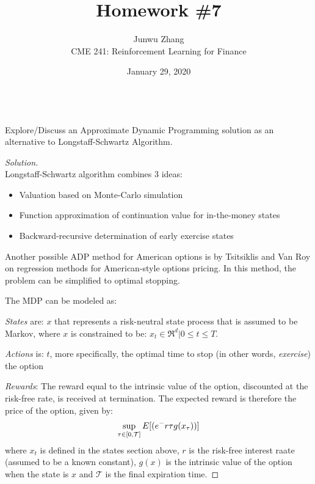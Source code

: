 \documentclass[12pt]{article}
\date{January 29, 2020}
\newenvironment{problem}[2][Problem]{\begin{trivlist}
\item[\hskip \labelsep {\bfseries #1}\hskip \labelsep {\bfseries #2.}]}{\end{trivlist}}
\newenvironment{solution}
  {\renewcommand\qedsymbol{$\blacksquare$}\begin{proof}[Solution]}
  {\end{proof}}
\begin{document}
 
\title{Homework \#7}
\author{Junwu Zhang\\ 
CME 241: Reinforcement Learning for Finance \\}
\maketitle

\begin{problem}{3}
\text{ }\\
Explore/Discuss an Approximate Dynamic Programming solution as an alternative to Longstaff-Schwartz Algorithm.
\end{problem}
\begin{solution}
\text{ }\\
Longstaff-Schwartz algorithm combines 3 ideas:
\begin{itemize}[noitemsep]
\item Valuation based on Monte-Carlo simulation
\item Function approximation of continuation value for in-the-money states
\item Backward-recursive determination of early exercise states
\end{itemize}

Another possible \gls{ADP} method for American options is by Tsitsiklis and Van Roy on regression methods for American-style options pricing. In this method, the problem can be simplified to optimal stopping. 

The \gls{MDP} can be modeled as:

\textit{States} are: $x$ that represents a risk-neutral state process that is assumed to be Markov, where $x$ is constrained to be: $x_t \in \mathfrak{R}^d \vert 0 \leq t \leq T$.

\textit{Actions} is: $t$, more specifically, the optimal time to stop (in other words, \textit{exercise}) the option

\textit{Rewards}: The reward equal to the intrinsic value of the option, discounted at the risk-free rate, is received at termination. The expected reward is therefore the price of the option, given by:
\begin{equation}
\sup_{\tau\in[0, \mathcal{T}]}\mathnormal{E}[(e^-{r\tau}g(x_\tau))]
\end{equation}
where $x_t$ is defined in the states section above, $r$ is the risk-free interest raate (assumed to be a known constant), $g(x)$ is the intrinsic value of the option when the state is $x$ and $\mathcal{T}$ is the final expiration time.


\end{solution}
\end{document}
